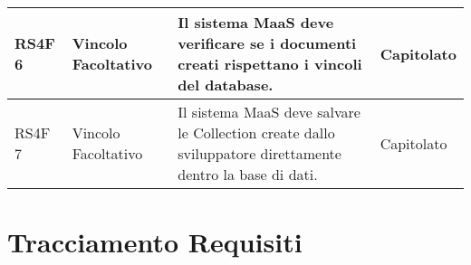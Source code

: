 \begin{center}
\begin{longtable}{ | l | p{2cm} | p{5cm} | p{1.7cm} |}
        RS4F 6 & Vincolo \newline  Facoltativo  & Il sistema MaaS deve verificare se i documenti creati rispettano i vincoli del database. &  Capitolato \newline  \\ \hline      
        RS4F 7 & Vincolo \newline  Facoltativo  & Il sistema MaaS deve salvare le Collection create dallo sviluppatore direttamente dentro la base di dati. &  Capitolato \newline  \\ \hline
      \end{longtable}
      \egroup
      \end{center}  
\clearpage

\section{Tracciamento Requisiti}
